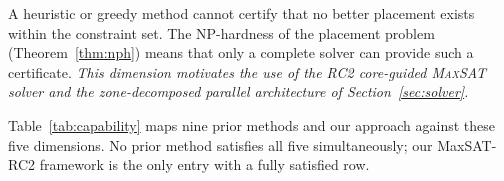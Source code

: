 \documentclass[journal]{IEEEtran}
\newcommand{\MAXSAT}{\textsc{MaxSAT}}
\begin{document}
\begin{description}[leftmargin=2em, itemsep=2pt]
  \item[\textbf{D5 --- Proven optimality certificate.}]
    A heuristic or greedy method cannot certify that no better
    placement exists within the constraint set. The NP-hardness of
    the placement problem (Theorem~\ref{thm:nph}) means that only a
    complete solver can provide such a certificate. \emph{This
    dimension motivates the use of the RC2 core-guided \MAXSAT{}
    solver and the zone-decomposed parallel architecture of
    Section~\ref{sec:solver}.}
\end{description}

Table~\ref{tab:capability} maps nine prior methods and our approach
against these five dimensions. No prior method satisfies all five
simultaneously; our MaxSAT-RC2 framework is the only entry with a
fully satisfied row.
\end{document}
